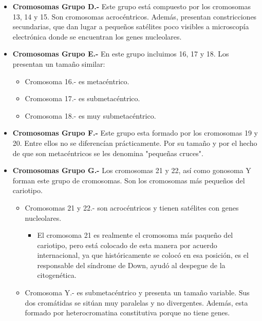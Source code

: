 \documentclass[12pt,letterpaper,titlepage]{article}
\begin{document}
\begin{itemize}
\begin{itemize}
\item  \textbf{Cromosomas Grupo D.-} Este grupo está compuesto por los cromosomas 13, 14 y 15. Son cromosomas acrocéntricos. Además, presentan constricciones secundarias, que dan lugar a pequeños satélites poco visibles a microscopía electrónica donde se encuentran los genes nucleolares.
\item  \textbf{Cromosomas Grupo E.-} En este grupo incluimos 16, 17 y 18. Los presentan un tamaño similar:\\
\begin{itemize}\itemsep=0pt
\item  {Cromosoma 16.-} es metacéntrico. 
\item  {Cromosoma 17.-} es submetacéntrico. 
\item  {Cromosoma 18.-} es muy submetacéntrico. 
\end{itemize}

\item  \textbf{Cromosomas Grupo F.-} Este grupo esta formado por los cromosomas 19 y 20. Entre ellos no se diferencían prácticamente. Por su tamaño y por el hecho de que son metacéntricos se les denomina "pequeñas cruces".
\item  \textbf{Cromosomas Grupo G.-} Los cromosomas 21 y 22, así como gonosoma Y forman este grupo de cromosomas. Son los cromosomas más pequeños del cariotipo.
\begin{itemize}\itemsep=0pt
\item  {Cromosomas 21 y 22.-} son acrocéntricos y tienen satélites con genes nucleolares. 
\begin{itemize}\itemsep=0pt
\item  El cromosoma 21 es realmente el cromosoma más paqueño del cariotipo, pero está colocado de esta manera por acuerdo internacional, ya que históricamente se colocó en esa posición, es el responsable del síndrome de Down, ayudó al despegue de la citogenética. 
\end{itemize}

\item  {Cromosoma Y.-} es submetacéntrico y presenta un tamaño variable. Sus dos cromátidas se sitúan muy paralelas y no divergentes. Además, esta formado por heterocromatina constitutiva porque no tiene genes. 
\end{itemize}

\end{itemize}


\end{itemize}
\newpage
\end{document}

